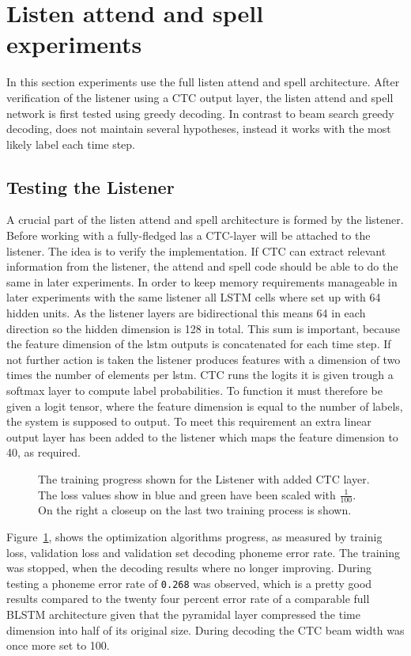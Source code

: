 \section{Listen attend and spell experiments}
In this section experiments use the full listen attend and spell architecture. After verification of the listener using a CTC output layer, the listen attend and spell network is first tested using greedy decoding. In contrast to beam search greedy decoding, does not maintain several hypotheses, instead it works with the most likely label each time step.

\subsection{Testing the Listener}
A crucial part of the listen attend and spell architecture is formed by the listener. Before working with a fully-fledged las a CTC-layer will be attached to the listener.
The idea is to verify the implementation. If CTC can extract relevant information from the listener, the attend and spell code should be able to do the same in later experiments. In order to keep memory requirements manageable in later experiments with the same listener all LSTM cells where set up with 64 hidden units. As the listener layers are bidirectional this means 64 in each direction so the hidden dimension is 128 in total. This sum is important, because the feature dimension of the lstm outputs is concatenated for each time step. If not further action is taken the listener produces features with a dimension of two times the number of elements per lstm.
CTC runs the logits it is given trough a softmax layer to compute label probabilities. To function it must therefore be given a logit tensor, where the feature dimension is equal to the number of labels, the system is supposed to output. To meet this requirement an extra linear output layer has been added to the listener which maps the feature dimension to 40, as required.
\begin{figure}


\caption{The training progress shown for the Listener with added CTC layer. The loss values show in blue and green have been scaled with $\frac{1}{100}$. On the right a closeup on the last two training process is shown.}
\label{fig:listenCTC}
\end{figure}
Figure~\ref{fig:listenCTC}, shows the optimization algorithms progress, as measured by trainig loss, validation loss and validation set decoding phoneme error rate. The training was stopped, when the decoding results where no longer improving. During testing a phoneme error rate of \texttt{0.268} was observed, which is a pretty good results compared to the twenty four percent error rate of a comparable full BLSTM architecture given that the pyramidal layer compressed the time dimension into half of its original size. During decoding the CTC beam width was once more set to 100.



